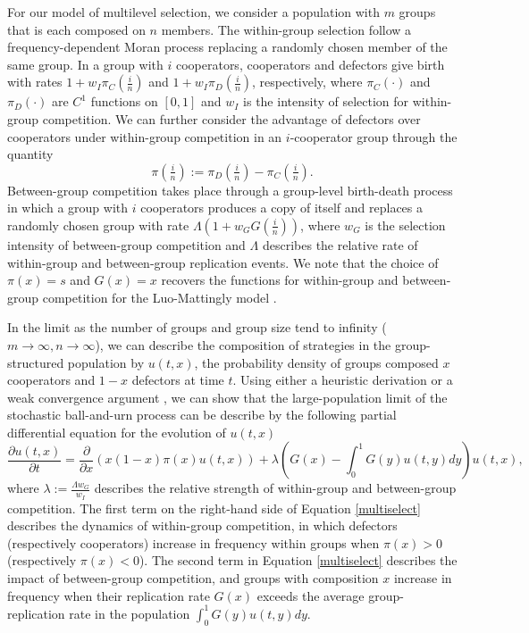 \documentclass[11pt]{article}
\numberwithin{equation}{section}
\newcommand{\paren}[1]{\left(#1\right)}
\newcommand{\PD}[2]{\frac{\partial#1}{\partial#2}}
\begin{document}
{For our model of multilevel selection, we consider a population with $m$ groups that is each composed on $n$ members. The within-group selection follow a frequency-dependent Moran process  replacing a randomly chosen member of the same group.
In a group with $i$ cooperators, cooperators and defectors give birth with rates $1 + w_I \pi_C(\frac{i}{n})$ and $1 + w_I \pi_D(\frac{i}{n})$, respectively, where $\pi_C(\cdot)$ and $\pi_D(\cdot)$ are $C^1$ functions on $[0,1]$ and $w_I$ is the intensity of selection for within-group competition. We can further consider the advantage of defectors over cooperators under within-group competition in an $i$-cooperator group through the quantity \begin{equation} \label{eq:piofi}  \pi\left(\tfrac{i}{n}\right) :=  \pi_D\left(\tfrac{i}{n}\right) - \pi_C\left(\tfrac{i}{n}\right). \end{equation} 
Between-group competition takes place through a group-level birth-death process in which a group with $i$ cooperators produces a copy of itself and replaces a randomly chosen group with rate $\Lambda(1 + w_G G(\frac{i}{n}))$, where $w_G$ is the selection intensity of between-group competition and $\Lambda$ describes the relative rate of within-group and between-group replication events. We note that the choice of $\pi(x) = s$ and $G(x) = x$ recovers the functions for within-group and between-group competition for the Luo-Mattingly model \cite{luo2014unifying,luo2017scaling}.

In the limit as the number of groups and group size tend to infinity ($m \to \infty, n \to \infty$), we can describe the composition of strategies in the group-structured population by $u(t,x)$, the probability density of groups composed $x$ cooperators and $1-x$ defectors at time $t$. Using either a heuristic derivation \cite{luo2014unifying,van2014simple,cooney2019replicator} or a weak convergence argument \cite{luo2017scaling}, we can show that the large-population limit of the stochastic ball-and-urn process can be describe by the following partial differential equation for the evolution of $u(t,x)$ 
%
\begin{equation}\label{multiselect}
\PD{u(t,x)}{t}=\PD{}{x}\paren{x(1-x)\pi(x)u(t,x)} +\lambda \paren{G(x)-\int_0^1 G(y)u(t,y)dy}u(t,x),
\end{equation}
where $\lambda := \frac{\Lambda w_G}{w_I}$ describes the relative strength of within-group and between-group competition. The first term on the right-hand side of Equation \ref{multiselect} describes the dynamics of within-group competition, in which defectors (respectively cooperators) increase in frequency within groups when $\pi(x) > 0$ (respectively $\pi(x) < 0$). The second term in Equation \ref{multiselect} describes the impact of between-group competition, and groups with composition $x$ increase in frequency when their replication rate $G(x)$ exceeds the average group-replication rate in the population $\int_0^1 G(y) u(t,y) dy$.

}
\end{document}
